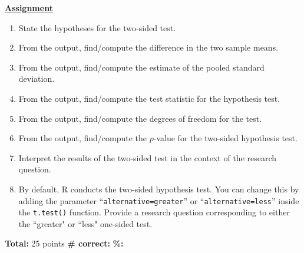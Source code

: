 \documentclass[11pt]{article}
\begin{document}
\textbf{\underline{Assignment}}
\begin{enumerate}
	\item State the hypotheses for the two-sided test.
	\item From the output, find/compute the difference in the two sample means.
	\item From the output, find/compute the estimate of the pooled standard deviation.
	\item From the output, find/compute the test statistic for the hypothesis test. 
	\item From the output, find/compute the degrees of freedom for the test. 
	\item From the output, find/compute the $p$-value for the two-sided hypothesis test.
	\item Interpret the results of the two-sided test in the context of the research question.
	\item By default, R conducts the two-sided hypothesis test. You can change this by adding the parameter ``\texttt{alternative=greater}'' or ``\texttt{alternative=less}'' inside the \texttt{t.test()} function. Provide a research question corresponding to either the ``greater" or ``less" one-sided test. 
\end{enumerate}

\vfill
\textbf{Total:} 25 points \hspace{14pt} \textbf{\# correct:} \underline{\hspace{1in}}  \hspace{14pt} \textbf{\%:} \underline{\hspace{1in}} 
\end{document}
